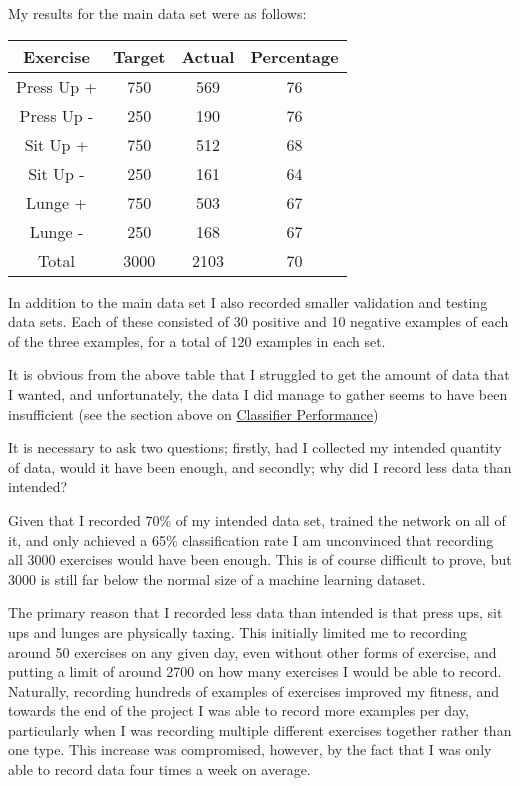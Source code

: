 \documentclass[a4paper]{article}
\begin{document}
My results for the main data set were as follows:

\begin{center}
  \begin{tabular}{|c|c|c|c|}
      \hline
      Exercise & Target & Actual & Percentage \\
      \hline
      Press Up + & 750 & 569 & 76 \\
      \hline
      Press Up - & 250 & 190 & 76 \\
      \hline
      Sit Up + & 750 & 512 &  68\\
      \hline
      Sit Up - & 250 & 161 & 64 \\
      \hline
      Lunge + & 750 & 503 & 67 \\
      \hline
      Lunge - & 250 & 168 & 67\\
      \hline
      Total & 3000 & 2103 & 70 \\
      \hline
      \end{tabular}
\end{center}

In addition to the main data set I also recorded smaller validation and testing data sets. Each of these consisted of 30 positive and 10 negative examples of each of the three examples, for a total of 120 examples in each set.

It is obvious from the above table that I struggled to get the amount of data that I wanted, and unfortunately, the data I did manage to gather seems to have been insufficient (see the section above on \hyperref[subsec:ev_cp]{Classifier Performance})

It is necessary to ask two questions; firstly, had I collected my intended quantity of data, would it have been enough, and secondly; why did I record less data than intended?

Given that I recorded 70\% of my intended data set, trained the network on all of it, and only achieved a 65\% classification rate I am unconvinced that recording all 3000 exercises would have been enough. This is of course difficult to prove, but 3000 is still far below the normal size of a machine learning dataset.

The primary reason that I recorded less data than intended is that press ups, sit ups and lunges are physically taxing.\cite{evref2} This initially limited me to recording around 50 exercises on any given day, even without other forms of exercise, and putting a limit of around 2700 on how many exercises I would be able to record.\cite{evref3} 
Naturally, recording hundreds of examples of exercises improved my fitness, and towards the end of the project I was able to record more examples per day, particularly when I was recording multiple different exercises together rather than one type. This increase was compromised, however, by the fact that I was only able to record data four times a week on average.
\end{document}

